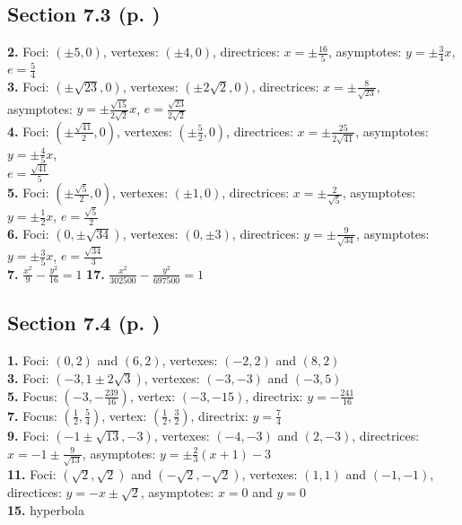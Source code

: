 \begin{multicols*}{2}
\subsection*{Section 7.3 (p. \pageref{sec7dot3})}
\textbf{2.} Foci: $(\pm 5,0)$, vertexes: $(\pm 4,0)$, directrices: $x=\pm\frac{16}{5}$,
asymptotes: $y=\pm\frac{3}{4}x$, $e=\frac{5}{4}$\\
\textbf{3.} Foci: $(\pm \sqrt{23},0)$, vertexes: $(\pm 2\sqrt{2},0)$,
directrices: $x=\pm\frac{8}{\sqrt{23}}$,\\asymptotes: $y=\pm\frac{\sqrt{15}}{2\sqrt{2}}x$,
$e=\frac{\sqrt{23}}{2\sqrt{2}}$\\
\textbf{4.} Foci: $(\pm\frac{\sqrt{41}}{2},0)$, vertexes: $(\pm\frac{5}{2},0)$,
directrices: $x=\pm\frac{25}{2\sqrt{41}}$, asymptotes: $y=\pm\frac{4}{5}x$,\\$e=\frac{\sqrt{41}}{5}$\\
\textbf{5.} Foci: $(\pm\frac{\sqrt{5}}{2},0)$, vertexes: $(\pm 1,0)$,
directrices: $x=\pm\frac{2}{\sqrt{5}}$, asymptotes: $y=\pm\frac{1}{2}x$, $e=\frac{\sqrt{5}}{2}$\\
\textbf{6.} Foci: $(0,\pm \sqrt{34})$, vertexes: $(0,\pm 3)$,
directrices: $y=\pm\frac{9}{\sqrt{34}}$, asymptotes: $y=\pm\frac{3}{5}x$, $e=\frac{\sqrt{34}}{3}$\\
\textbf{7.} $\frac{x^2}{9} - \frac{y^2}{16}=1$ \quad
\textbf{17.} $\frac{x^2}{302500} - \frac{y^2}{697500}=1$
\subsection*{Section 7.4 (p. \pageref{sec7dot4})}
\textbf{1.} Foci: $(0,2)$ and $(6,2)$, vertexes: $(-2,2)$ and $(8,2)$\\
\textbf{3.} Foci: $(-3,1 \pm 2\sqrt{3})$, vertexes: $(-3,-3)$ and $(-3,5)$\\
\textbf{5.} Focus: $(-3,-\frac{239}{16})$, vertex: $(-3,-15)$, directrix: $y=-\frac{241}{16}$\\
\textbf{7.} Focus: $\left(\frac{1}{2},\frac{5}{4}\right)$,
vertex: $\left(\frac{1}{2},\frac{3}{2}\right)$, directrix: $y=\frac{7}{4}$\\
\textbf{9.} Foci: $(-1 \pm \sqrt{13},-3)$, vertexes: $(-4,-3)$ and $(2,-3)$, 
directrices: $x=-1 \pm \frac{9}{\sqrt{13}}$, asymptotes: $y=\pm\frac{2}{3}(x+1)-3$\\
\textbf{11.} Foci: $(\sqrt{2},\sqrt{2})$ and $(-\sqrt{2},-\sqrt{2})$,
vertexes: $(1,1)$ and $(-1,-1)$, directices: $y=-x \pm \sqrt{2}$, asymptotes: $x=0$ and $y=0$\\
\textbf{15.} hyperbola

\end{multicols*}
